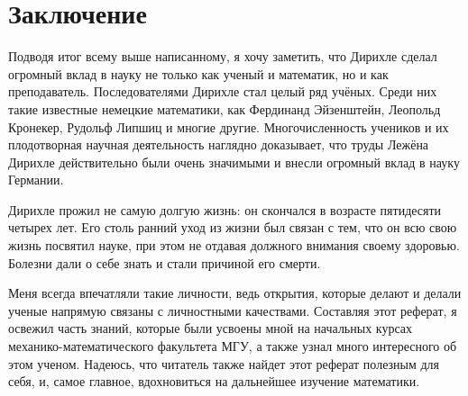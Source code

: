 \chapter{Заключение}

Подводя итог всему выше написанному, я хочу заметить, что Дирихле сделал огромный вклад в науку не только как ученый и математик, но и как преподаватель. Последователями Дирихле стал целый ряд учёных. Среди них такие известные немецкие математики, как Фердинанд Эйзенштейн, Леопольд Кронекер, Рудольф Липшиц и многие другие. Многочисленность учеников и их плодотворная научная деятельность наглядно доказывает, что труды Лежёна Дирихле действительно были очень значимыми и внесли огромный вклад в науку Германии.

Дирихле прожил не самую долгую жизнь: он скончался в возрасте пятидесяти четырех лет. Его столь ранний уход из жизни был связан с тем, что он всю свою жизнь посвятил науке, при этом не отдавая должного внимания своему здоровью. Болезни дали о себе знать и стали причиной его смерти. 

Меня всегда впечатляли такие личности, ведь открытия, которые делают и делали ученые напрямую связаны с личностными качествами. Составляя этот реферат, я освежил часть знаний, которые были усвоены мной на начальных курсах механико-математического факультета МГУ, а также узнал много интересного об этом ученом. Надеюсь, что читатель также найдет этот реферат полезным для себя, и, самое главное, вдохновиться на дальнейшее изучение математики.



